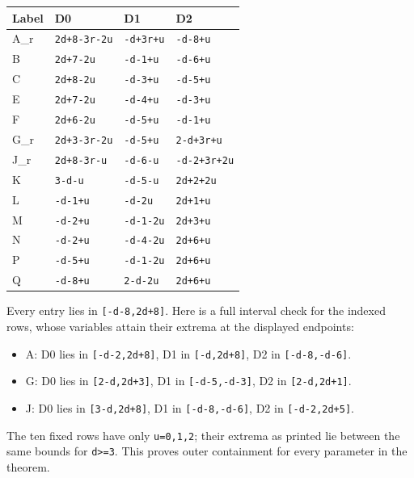 \documentclass[
  10pt,
]{scrreprt}
\providecommand{\tightlist}{%
  \setlength{\itemsep}{0pt}\setlength{\parskip}{0pt}}
\begin{document}
\begin{longtable}[]{@{}llll@{}}
\toprule\noalign{}
Label & D0 & D1 & D2 \\
\midrule\noalign{}
\endhead
\bottomrule\noalign{}
\endlastfoot
A\_r & \texttt{2d+8-3r-2u} & \texttt{-d+3r+u} & \texttt{-d-8+u} \\
B & \texttt{2d+7-2u} & \texttt{-d-1+u} & \texttt{-d-6+u} \\
C & \texttt{2d+8-2u} & \texttt{-d-3+u} & \texttt{-d-5+u} \\
E & \texttt{2d+7-2u} & \texttt{-d-4+u} & \texttt{-d-3+u} \\
F & \texttt{2d+6-2u} & \texttt{-d-5+u} & \texttt{-d-1+u} \\
G\_r & \texttt{2d+3-3r-2u} & \texttt{-d-5+u} & \texttt{2-d+3r+u} \\
J\_r & \texttt{2d+8-3r-u} & \texttt{-d-6-u} & \texttt{-d-2+3r+2u} \\
K & \texttt{3-d-u} & \texttt{-d-5-u} & \texttt{2d+2+2u} \\
L & \texttt{-d-1+u} & \texttt{-d-2u} & \texttt{2d+1+u} \\
M & \texttt{-d-2+u} & \texttt{-d-1-2u} & \texttt{2d+3+u} \\
N & \texttt{-d-2+u} & \texttt{-d-4-2u} & \texttt{2d+6+u} \\
P & \texttt{-d-5+u} & \texttt{-d-1-2u} & \texttt{2d+6+u} \\
Q & \texttt{-d-8+u} & \texttt{2-d-2u} & \texttt{2d+6+u} \\
\end{longtable}

Every entry lies in \texttt{{[}-d-8,2d+8{]}}. Here is a full interval
check for the indexed rows, whose variables attain their extrema at the
displayed endpoints:

\begin{itemize}
\tightlist
\item
  A: D0 lies in \texttt{{[}-d-2,2d+8{]}}, D1 in \texttt{{[}-d,2d+8{]}},
  D2 in \texttt{{[}-d-8,-d-6{]}}.
\item
  G: D0 lies in \texttt{{[}2-d,2d+3{]}}, D1 in \texttt{{[}-d-5,-d-3{]}},
  D2 in \texttt{{[}2-d,2d+1{]}}.
\item
  J: D0 lies in \texttt{{[}3-d,2d+8{]}}, D1 in \texttt{{[}-d-8,-d-6{]}},
  D2 in \texttt{{[}-d-2,2d+5{]}}.
\end{itemize}

The ten fixed rows have only \texttt{u=0,1,2}; their extrema as printed
lie between the same bounds for \texttt{d\textgreater{}=3}. This proves
outer containment for every parameter in the theorem.
\end{document}
